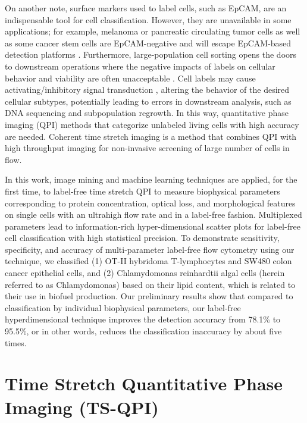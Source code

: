 \documentclass[aps,pra,preprint,superscriptaddress]{revtex4-1}
\begin{document}
On another note, surface markers used to label cells, such as EpCAM, are an indispensable tool for cell classification. However, they are unavailable in some applications; for example, melanoma or pancreatic circulating tumor cells as well as some cancer stem cells are EpCAM-negative and will escape EpCAM-based detection platforms \cite{kling2012beyond}. Furthermore, large-population cell sorting opens the doors to downstream operations where the negative impacts of labels on cellular behavior and viability are often unacceptable \cite{}. Cell labels may cause activating/inhibitory signal transduction \cite{}, altering the behavior of the desired cellular subtypes, potentially leading to errors in downstream analysis, such as DNA sequencing and subpopulation regrowth. In this way, quantitative phase imaging (QPI) methods \cite{ikeda2005hilbert,popescu2011quantitative,pham2013real} that categorize unlabeled living cells with high accuracy are needed. Coherent time stretch imaging is a method that combines QPI with high throughput imaging for non-invasive screening of large number of cells in flow.

In this work, image mining and machine learning techniques are applied, for the first time, to label-free time stretch QPI to measure biophysical parameters corresponding to protein concentration, optical loss, and morphological features on single cells with an ultrahigh flow rate and in a label-free fashion. Multiplexed parameters lead to information-rich hyper-dimensional scatter plots for label-free cell classification with high statistical precision. To demonstrate sensitivity, specificity, and accuracy of multi-parameter label-free flow cytometry using our technique, we classified (1) OT-II hybridoma T-lymphocytes and SW480 colon cancer epithelial cells, and (2) Chlamydomonas reinhardtii algal cells (herein referred to as Chlamydomonas) based on their lipid content, which is related to their use in biofuel production. Our preliminary results show that compared to classification by individual biophysical parameters, our label-free hyperdimensional technique improves the detection accuracy from 78.1\% to 95.5\%, or in other words, reduces the classification inaccuracy by about five times. 

\section{Time Stretch Quantitative Phase Imaging (TS-QPI)}
\end{document}

